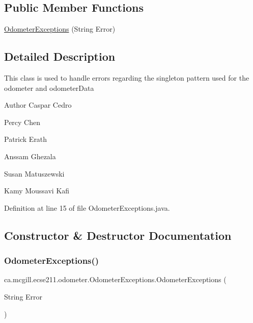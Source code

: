 \subsection*{Public Member Functions}
\begin{DoxyCompactItemize}
\item 
\hyperlink{classca_1_1mcgill_1_1ecse211_1_1odometer_1_1_odometer_exceptions_a25aa31baebe4906716a920929f0284d2}{Odometer\+Exceptions} (String Error)
\end{DoxyCompactItemize}


\subsection{Detailed Description}
This class is used to handle errors regarding the singleton pattern used for the odometer and odometer\+Data

\begin{DoxyAuthor}{Author}
Caspar Cedro 

Percy Chen 

Patrick Erath 

Anssam Ghezala 

Susan Matuszewski 

Kamy Moussavi Kafi 
\end{DoxyAuthor}


Definition at line 15 of file Odometer\+Exceptions.\+java.



\subsection{Constructor \& Destructor Documentation}
\mbox{\label{classca_1_1mcgill_1_1ecse211_1_1odometer_1_1_odometer_exceptions_a25aa31baebe4906716a920929f0284d2}} 
\subsubsection{\texorpdfstring{Odometer\+Exceptions()}{OdometerExceptions()}}
{\footnotesize\ttfamily ca.\+mcgill.\+ecse211.\+odometer.\+Odometer\+Exceptions.\+Odometer\+Exceptions (\begin{DoxyParamCaption}\item[{String}]{Error }\end{DoxyParamCaption})}

